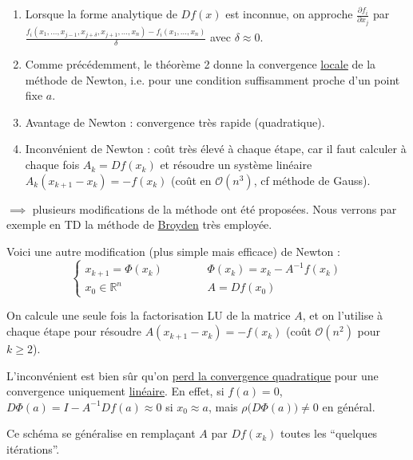 \documentclass[a4paper,11pt]{article}
\newcommand{\R}{\mathbb{R}}
\newcommand{\gO}{\mathcal{O}}
\theoremstyle{plain} %
\begin{document}
    \begin{remark}
        \begin{enumerate}[-]
            \item Lorsque la forme analytique de $Df(x)$ est inconnue, on approche
                $\displaystyle\frac{\partial f_i}{\partial x_j}$ par $\displaystyle\frac{f_i(x_1,\dots,x_{j-1},x_{j+\delta},x_{j+1},\dots,x_n) - f_i(x_1, \dots, x_n)}{\delta}$ avec $\delta \approx 0$.

            \item Comme précédemment, le théorème 2 donne la convergence \underline{locale}
                de la méthode de Newton, i.e. pour une condition suffisamment proche d'un
                point fixe $a$.

            \item Avantage de Newton : convergence très rapide (quadratique).

            \item Inconvénient de Newton : coût très élevé à chaque étape, car il faut
                calculer à chaque fois $A_k = Df(x_k)$ et résoudre un système linéaire
                $A_k(x_{k+1} - x_k) = -f(x_k)$ (coût en $\gO(n^3)$, cf méthode de Gauss).
        \end{enumerate}

        $\implies$ plusieurs modifications de la méthode ont été proposées. Nous verrons
        par exemple en TD la méthode de \underline{Broyden} très employée.
        
        Voici une autre modification (plus simple mais efficace) de Newton :
        \begin{equation*}
            \left\lbrace
            \begin{split}
                x_{k+1}  = \Phi(x_k) & \hspace{1cm} & \Phi(x_k) = x_k - A^{-1}f(x_k) \\
                x_0  \in \R^n & & A = Df(x_0)
            \end{split}
            \right.
        \end{equation*}

        On calcule une seule fois la factorisation LU de la matrice $A$, et on l'utilise
        à chaque étape pour résoudre $A(x_{k+1} - x_k) = -f(x_k)$ (coût $\gO(n^2)$ pour $k\geq 2$).

        L'inconvénient est bien sûr qu'on \underline{perd la convergence quadratique} pour
        une convergence uniquement \underline{linéaire}. En effet, si $f(a) = 0$,
        $D\Phi(a) = I - A^{-1}Df(a) \approx 0$ si $x_0 \approx a$, mais
        $\rho \Big( D\Phi(a) \Big) \ne 0$ en général.

        Ce schéma se généralise en remplaçant $A$ par $Df(x_k)$ toutes les ``quelques
        itérations''.
    \end{remark}
\end{document}
